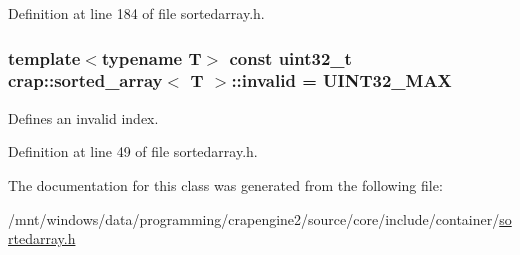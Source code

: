 Definition at line 184 of file sortedarray.\+h.

\hypertarget{classcrap_1_1sorted__array_a9f413d7e9b3f458d98a9c80727886abc}{
\subsubsection[{invalid}]{\setlength{\rightskip}{0pt plus 5cm}template$<$typename T$>$ const uint32\+\_\+t {\bf crap\+::sorted\+\_\+array}$<$ T $>$\+::invalid = {\bf U\+I\+N\+T32\+\_\+\+M\+A\+X}\hspace{0.3cm}{\ttfamily [static]}}}\label{classcrap_1_1sorted__array_a9f413d7e9b3f458d98a9c80727886abc}


Defines an invalid index. 



Definition at line 49 of file sortedarray.\+h.



The documentation for this class was generated from the following file\+:\begin{DoxyCompactItemize}
\item 
/mnt/windows/data/programming/crapengine2/source/core/include/container/\hyperlink{sortedarray_8h}{sortedarray.\+h}\end{DoxyCompactItemize}
